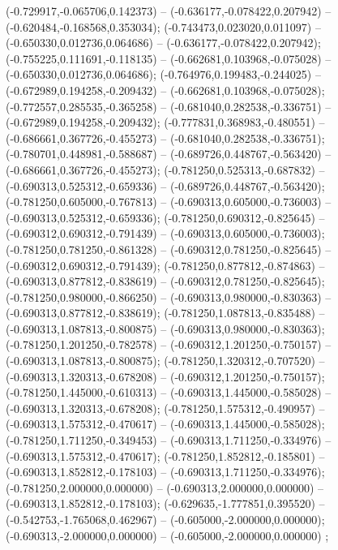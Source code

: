 (-0.729917,-0.065706,0.142373) -- (-0.636177,-0.078422,0.207942) -- (-0.620484,-0.168568,0.353034);
 (-0.743473,0.023020,0.011097) -- (-0.650330,0.012736,0.064686) -- (-0.636177,-0.078422,0.207942);
 (-0.755225,0.111691,-0.118135) -- (-0.662681,0.103968,-0.075028) -- (-0.650330,0.012736,0.064686);
 (-0.764976,0.199483,-0.244025) -- (-0.672989,0.194258,-0.209432) -- (-0.662681,0.103968,-0.075028);
 (-0.772557,0.285535,-0.365258) -- (-0.681040,0.282538,-0.336751) -- (-0.672989,0.194258,-0.209432);
 (-0.777831,0.368983,-0.480551) -- (-0.686661,0.367726,-0.455273) -- (-0.681040,0.282538,-0.336751);
 (-0.780701,0.448981,-0.588687) -- (-0.689726,0.448767,-0.563420) -- (-0.686661,0.367726,-0.455273);
 (-0.781250,0.525313,-0.687832) -- (-0.690313,0.525312,-0.659336) -- (-0.689726,0.448767,-0.563420);
 (-0.781250,0.605000,-0.767813) -- (-0.690313,0.605000,-0.736003) -- (-0.690313,0.525312,-0.659336);
 (-0.781250,0.690312,-0.825645) -- (-0.690312,0.690312,-0.791439) -- (-0.690313,0.605000,-0.736003);
 (-0.781250,0.781250,-0.861328) -- (-0.690312,0.781250,-0.825645) -- (-0.690312,0.690312,-0.791439);
 (-0.781250,0.877812,-0.874863) -- (-0.690313,0.877812,-0.838619) -- (-0.690312,0.781250,-0.825645);
 (-0.781250,0.980000,-0.866250) -- (-0.690313,0.980000,-0.830363) -- (-0.690313,0.877812,-0.838619);
 (-0.781250,1.087813,-0.835488) -- (-0.690313,1.087813,-0.800875) -- (-0.690313,0.980000,-0.830363);
 (-0.781250,1.201250,-0.782578) -- (-0.690312,1.201250,-0.750157) -- (-0.690313,1.087813,-0.800875);
 (-0.781250,1.320312,-0.707520) -- (-0.690313,1.320313,-0.678208) -- (-0.690312,1.201250,-0.750157);
 (-0.781250,1.445000,-0.610313) -- (-0.690313,1.445000,-0.585028) -- (-0.690313,1.320313,-0.678208);
 (-0.781250,1.575312,-0.490957) -- (-0.690313,1.575312,-0.470617) -- (-0.690313,1.445000,-0.585028);
 (-0.781250,1.711250,-0.349453) -- (-0.690313,1.711250,-0.334976) -- (-0.690313,1.575312,-0.470617);
 (-0.781250,1.852812,-0.185801) -- (-0.690313,1.852812,-0.178103) -- (-0.690313,1.711250,-0.334976);
 (-0.781250,2.000000,0.000000) -- (-0.690313,2.000000,0.000000) -- (-0.690313,1.852812,-0.178103);
 (-0.629635,-1.777851,0.395520) -- (-0.542753,-1.765068,0.462967) -- (-0.605000,-2.000000,0.000000);
 (-0.690313,-2.000000,0.000000) -- (-0.605000,-2.000000,0.000000) ;
